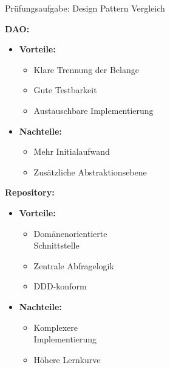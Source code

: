 \begin{example2}{Prüfungsaufgabe: Design Pattern Vergleich}
\begin{minipage}[t]{0.55\textwidth}
    \textbf{DAO:}
    \begin{itemize}
        \item \textbf{Vorteile:}
        \begin{itemize}
            \item Klare Trennung der Belange
            \item Gute Testbarkeit
            \item Austauschbare Implementierung
        \end{itemize}
        \item \textbf{Nachteile:}
        \begin{itemize}
            \item Mehr Initialaufwand
            \item Zusätzliche Abstraktionsebene
        \end{itemize}
    \end{itemize}
\end{minipage}
\begin{minipage}[t]{0.4\textwidth}
    \textbf{Repository:}
    \begin{itemize}
        \item \textbf{Vorteile:}
        \begin{itemize}
            \item Domänenorientierte\\ Schnittstelle
            \item Zentrale Abfragelogik
            \item DDD-konform
        \end{itemize}
        \item \textbf{Nachteile:}
        \begin{itemize}
            \item Komplexere\\ Implementierung
            \item Höhere Lernkurve
        \end{itemize}
    \end{itemize}
\end{minipage}
\end{example2}

